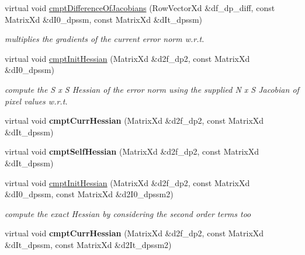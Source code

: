 \begin{DoxyCompactItemize}
\item 
virtual void \hyperlink{classAppearanceModel_a6fc5e1c4eeacc794f1783926c6613db3}{cmpt\-Difference\-Of\-Jacobians} (Row\-Vector\-Xd \&df\-\_\-dp\-\_\-diff, const Matrix\-Xd \&d\-I0\-\_\-dpssm, const Matrix\-Xd \&d\-It\-\_\-dpssm)
\begin{DoxyCompactList}\small\item\em multiplies the gradients of the current error norm w.\-r.\-t. \end{DoxyCompactList}\item 
virtual void \hyperlink{classAppearanceModel_ab153b47d09f121796d3f411626a5321c}{cmpt\-Init\-Hessian} (Matrix\-Xd \&d2f\-\_\-dp2, const Matrix\-Xd \&d\-I0\-\_\-dpssm)
\begin{DoxyCompactList}\small\item\em compute the S x S Hessian of the error norm using the supplied N x S Jacobian of pixel values w.\-r.\-t. \end{DoxyCompactList}\item 
\hypertarget{classAppearanceModel_a5052efc12c81f67dcfcaba5a197ed74e}{virtual void {\bfseries cmpt\-Curr\-Hessian} (Matrix\-Xd \&d2f\-\_\-dp2, const Matrix\-Xd \&d\-It\-\_\-dpssm)}\label{classAppearanceModel_a5052efc12c81f67dcfcaba5a197ed74e}

\item 
\hypertarget{classAppearanceModel_ad55ef54a7c21ff6ee7fb77aac4b33453}{virtual void {\bfseries cmpt\-Self\-Hessian} (Matrix\-Xd \&d2f\-\_\-dp2, const Matrix\-Xd \&d\-It\-\_\-dpssm)}\label{classAppearanceModel_ad55ef54a7c21ff6ee7fb77aac4b33453}

\item 
\hypertarget{classAppearanceModel_aa904369642a3ef3c8f0e49b46861166d}{virtual void \hyperlink{classAppearanceModel_aa904369642a3ef3c8f0e49b46861166d}{cmpt\-Init\-Hessian} (Matrix\-Xd \&d2f\-\_\-dp2, const Matrix\-Xd \&d\-I0\-\_\-dpssm, const Matrix\-Xd \&d2\-I0\-\_\-dpssm2)}\label{classAppearanceModel_aa904369642a3ef3c8f0e49b46861166d}

\begin{DoxyCompactList}\small\item\em compute the exact Hessian by considering the second order terms too \end{DoxyCompactList}\item 
\hypertarget{classAppearanceModel_a27207e73e39f5270bb8ef1193cb4f768}{virtual void {\bfseries cmpt\-Curr\-Hessian} (Matrix\-Xd \&d2f\-\_\-dp2, const Matrix\-Xd \&d\-It\-\_\-dpssm, const Matrix\-Xd \&d2\-It\-\_\-dpssm2)}\label{classAppearanceModel_a27207e73e39f5270bb8ef1193cb4f768}


\end{DoxyCompactItemize}
